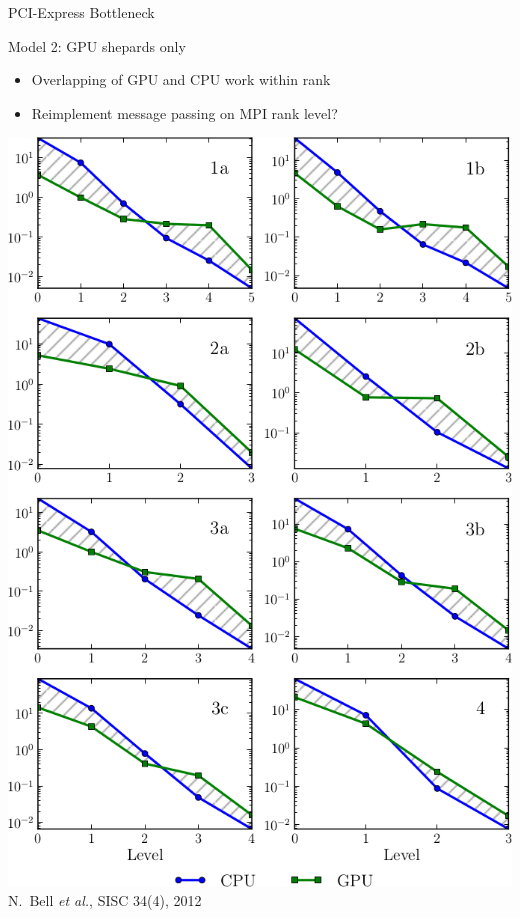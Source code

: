 \begin{frame}{PCI-Express Bottleneck}
\begin{minipage}{0.55\textwidth}
    \begin{block}{Model 2: GPU shepards only}
     \begin{itemize}
      \item Overlapping of GPU and CPU work within rank
      \item Reimplement message passing on MPI rank level?
     \end{itemize}
    \end{block}
  \end{minipage}
  \begin{minipage}{0.44\textwidth}
  \includegraphics[width=1.0\textwidth]{figures/amg-cpu-gpu.png} \\
  {\scriptsize N.~Bell \textit{et al.}, SISC 34(4), 2012}
  \end{minipage}
\end{frame}
